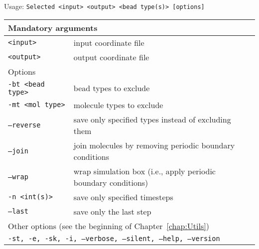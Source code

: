 \vspace{1em}
\noindent
Usage: \tt{Selected <input> <output> <bead type(s)> [options]}
\noindent
\begin{longtable}{p{}p{}}
  \toprule
  \multicolumn{2}{l}{Mandatory arguments}\\
  \midrule
  \tt{<input>}        & input coordinate file\\
  \tt{<output>}       & output coordinate file\\
  \midrule
  \multicolumn{2}{l}{Options}\\
  \midrule
  \tt{-bt <bead type>} & bead types to exclude\\
  \tt{-mt <mol type>}  & molecule types to exclude\\
  \tt{--reverse}       & save only specified types instead of excluding them\\
  \tt{--join}          & join molecules by removing periodic boundary
                         conditions\\
  \tt{--wrap}          & wrap simulation box (i.e., apply periodic boundary
                         conditions)\\
  \tt{-n <int(s)>}     & save only specified timesteps\\
  \tt{--last}          & save only the last step\\
  \midrule
  \multicolumn{2}{l}{Other options (see the beginning of
                     Chapter~\ref{chap:Utils})}\\
  \midrule
  \multicolumn{2}{p{0.948\textwidth}}{\tt{-st},
                                      \tt{-e},
                                      \tt{-sk},
                                      \tt{-i},
                                      \tt{--verbose},
                                      \tt{--silent},
                                      \tt{--help},
                                      \tt{--version}}\\
  \bottomrule
\end{longtable}
